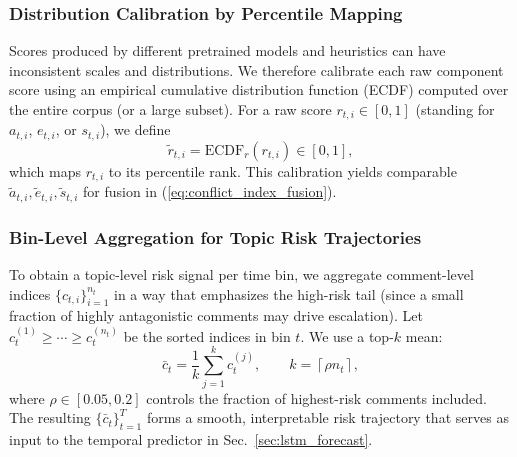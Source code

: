 \documentclass[journal]{IEEEtran}
\begin{document}
\subsubsection{Distribution Calibration by Percentile Mapping}\label{sec:calibration}
Scores produced by different pretrained models and heuristics can have inconsistent scales and distributions. We therefore calibrate each raw component score using an empirical cumulative distribution function (ECDF) computed over the entire corpus (or a large subset). For a raw score $r_{t,i}\in[0,1]$ (standing for $a_{t,i}$, $e_{t,i}$, or $s_{t,i}$), we define
\begin{equation}
\tilde{r}_{t,i} = \mathrm{ECDF}_r(r_{t,i}) \in [0,1],
\label{eq:ecdf}
\end{equation}
which maps $r_{t,i}$ to its percentile rank. This calibration yields comparable $\tilde{a}_{t,i},\tilde{e}_{t,i},\tilde{s}_{t,i}$ for fusion in (\ref{eq:conflict_index_fusion}).

\subsubsection{Bin-Level Aggregation for Topic Risk Trajectories}
To obtain a topic-level risk signal per time bin, we aggregate comment-level indices $\{c_{t,i}\}_{i=1}^{n_t}$ in a way that emphasizes the high-risk tail (since a small fraction of highly antagonistic comments may drive escalation). Let $c^{(1)}_t \ge \cdots \ge c^{(n_t)}_t$ be the sorted indices in bin $t$. We use a top-$k$ mean:
\begin{equation}
\bar{c}_t = \frac{1}{k}\sum_{j=1}^{k} c^{(j)}_t,\qquad k=\left\lceil \rho n_t \right\rceil,
\label{eq:topk_agg}
\end{equation}
where $\rho\in[0.05,0.2]$ controls the fraction of highest-risk comments included. The resulting $\{\bar{c}_t\}_{t=1}^T$ forms a smooth, interpretable risk trajectory that serves as input to the temporal predictor in Sec.~\ref{sec:lstm_forecast}.
\end{document}
